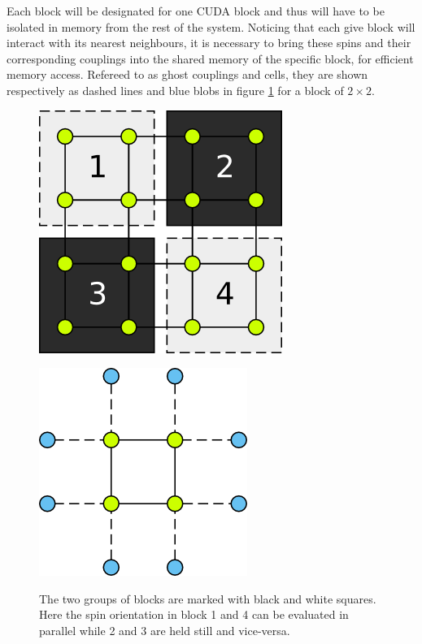 \documentclass[paper=a4, fontsize=11pt]{scrartcl} %
\numberwithin{equation}{section} %
\numberwithin{figure}{section} %
\numberwithin{table}{section} %
\begin{document}
Each block will be designated for one CUDA block and thus will have to be isolated in memory from the rest of the system. Noticing that each give block will interact with its nearest neighbours, it is necessary to bring these spins and their corresponding couplings into the shared memory of the specific block, for efficient memory access. Refereed to as ghost couplings and cells, they are shown respectively as dashed lines and blue blobs in figure \ref{fig:gost_cells} for a block of $2\times2$.


\begin{figure}
\centering
\begin{minipage}{.65\textwidth}
  \centering
  \includegraphics[width=.5\linewidth]{images/4x4.png}
  \caption{The two groups of blocks are marked with black and white squares. Here the spin orientation in block 1 and 4 can be evaluated in parallel while 2 and 3 are held still and vice-versa.}
  \label{fig:checker_grid}
\end{minipage}
\hspace{0.05\linewidth}
\begin{minipage}{.25\textwidth}
  \centering
  \includegraphics[width=1\linewidth]{images/2D_ghosts.png}
  \label{fig:gost_cells}
\end{minipage}
\end{figure}
\end{document}
